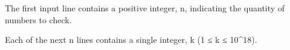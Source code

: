 The first input line contains a positive integer, n, indicating the quantity of numbers to check. 

Each of the next n lines contains a single integer, k (1 ≤ k ≤ 10\textasciicircum18).